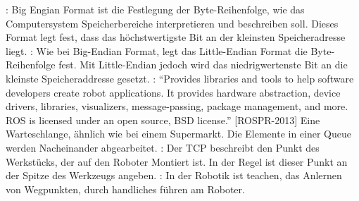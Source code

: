 \begin{acronym}
 : Big Engian Format ist die Festlegung der Byte-Reihenfolge, wie das Computersystem Speicherbereiche interpretieren und beschreiben soll. Dieses Format legt fest, dass das höchstwertigste Bit an der kleinsten Speicheradresse liegt.
 : Wie bei \acs{Big-Endian Format}, legt das Little-Endian Format die Byte-Reihenfolge fest. Mit Little-Endian jedoch wird das niedrigwertenste Bit an die kleinste Speicheraddresse gesetzt.
 : ``Provides libraries and tools to help software developers create robot applications. It provides hardware abstraction, device drivers, libraries, visualizers, message-passing, package management, and more. ROS is licensed under an open source, BSD license.'' [ROSPR-2013]
  Eine Warteschlange, ähnlich wie bei einem Supermarkt. Die Elemente in einer Queue werden Nacheinander abgearbeitet. 
 : Der TCP beschreibt den Punkt des Werkstücks, der auf den Roboter Montiert ist. In der Regel ist dieser Punkt an der Spitze des Werkzeugs angeben.
 : In der Robotik ist teachen, das Anlernen von Wegpunkten, durch handliches führen am Roboter.
\end{acronym}
